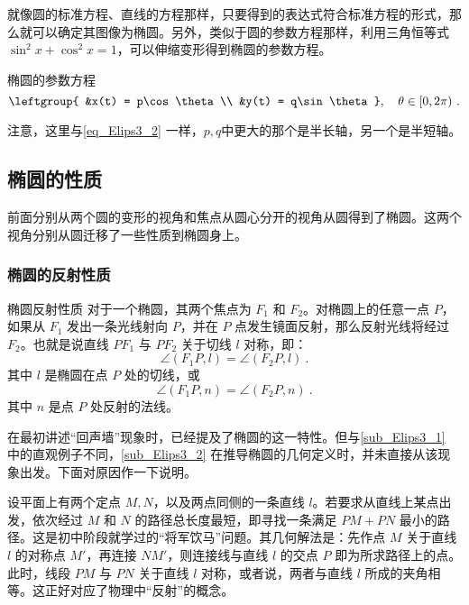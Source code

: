 就像圆的标准方程、直线的方程那样，只要得到的表达式符合标准方程的形式，那么就可以确定其图像为椭圆。另外，类似于圆的参数方程那样，利用三角恒等式$\sin^2x+\cos^2x=1$，可以伸缩变形得到椭圆的参数方程。
\begin{theorem}{椭圆的参数方程}
\begin{equation}\label{eq_Elips3_1}
\leftgroup{
&x(t) = p\cos \theta\\
&y(t) = q\sin \theta
},\quad \theta \in [0, 2\pi) ~.
\end{equation}
\end{theorem}
注意，这里与\autoref{eq_Elips3_2} 一样，$p,q$中更大的那个是半长轴，另一个是半短轴。

\subsection{椭圆的性质}

前面分别从两个圆的变形的视角和焦点从圆心分开的视角从圆得到了椭圆。这两个视角分别从圆迁移了一些性质到椭圆身上。

\subsubsection{椭圆的反射性质}

\begin{theorem}{椭圆反射性质}
对于一个椭圆，其两个焦点为 $F_1$ 和 $F_2$。对椭圆上的任意一点 $P$，如果从 $F_1$ 发出一条光线射向 $P$，并在 $P$ 点发生镜面反射，那么反射光线将经过 $F_2$。也就是说直线 $PF_1$ 与 $PF_2$ 关于切线 $l$ 对称，即：
\begin{equation}
\angle (F_1P, l) = \angle (F_2P, l)~.
\end{equation}
其中 $l$ 是椭圆在点 $P$ 处的切线，或
\begin{equation}
\angle (F_1P, n) = \angle (F_2P, n)~.
\end{equation}
其中 $n$ 是点 $P$ 处反射的法线。
\end{theorem}

在最初讲述“回声墙”现象时，已经提及了椭圆的这一特性。但与\autoref{sub_Elips3_1} 中的直观例子不同，\autoref{sub_Elips3_2} 在推导椭圆的几何定义时，并未直接从该现象出发。下面对原因作一下说明。

设平面上有两个定点 $M,N$，以及两点同侧的一条直线 $l$。若要求从直线上某点出发，依次经过 $M$ 和 $N$ 的路径总长度最短，即寻找一条满足 $PM + PN$ 最小的路径。这是初中阶段就学过的“将军饮马”问题。其几何解法是：先作点 $M$ 关于直线 $l$ 的对称点 $M'$，再连接 $NM'$，则连接线与直线 $l$ 的交点 $P$ 即为所求路径上的点。此时，线段 $PM$ 与 $PN$ 关于直线 $l$ 对称，或者说，两者与直线 $l$ 所成的夹角相等。这正好对应了物理中“反射”的概念。


